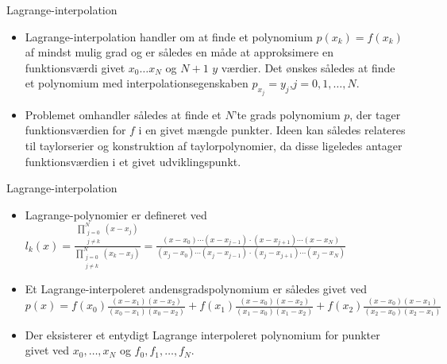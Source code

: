
\begin{frame}{Lagrange-interpolation}
    \begin{itemize}
        \item Lagrange-interpolation handler om at finde et polynomium $p(x_k)=f(x_k)$ af mindst mulig grad og er således en måde at approksimere en funktionsværdi givet $x_0 \ldots x_N$ og $N+1 $  $y$ værdier.
        Det ønskes således at finde et polynomium med interpolationsegenskaben $p_{x_j}=y_j$,$j=0,1,\ldots,N$.

        \item Problemet omhandler således at finde et $N$'te grads polynomium $p$, der tager funktionsværdien for $f$ i en givet mængde punkter. 
        Ideen kan således relateres til taylorserier og konstruktion af taylorpolynomier, da disse ligeledes antager funktionsværdien i et givet udviklingspunkt.
    \end{itemize}
\end{frame}
\begin{frame}{Lagrange-interpolation}
    \begin{itemize}
        \item Lagrange-polynomier er defineret ved \\
            $
            l_k(x)=\frac{\prod_{\substack{j=0 \\ {j \neq k}}}^{N}(x-x_j)}{\prod_{\substack{j=0 \\ {j \neq k}}}^{N}(x_k-x_j)}=\frac{(x-x_0) \cdots (x-x_{j-1}) \cdot (x-x_{j+1})\cdots(x-x_N)}{(x_j-x_0)\cdots (x_j-x_{j-1}) \cdot (x_j-x_{j+1})\cdots (x_j - x_N)}
            $
        \item Et Lagrange-interpoleret andensgradspolynomium er således givet ved $ p(x)=f(x_0)\frac{(x-x_1)(x-x_2)}{(x_0-x_1)(x_0-x_2)}+f(x_1)\frac{(x-x_0)(x-x_2)}{(x_1-x_0)(x_1-x_2)}+f(x_2)\frac{(x-x_0)(x-x_1)}{(x_2-x_0)(x_2-x_1)} $
        \item Der eksisterer et entydigt Lagrange interpoleret polynomium for punkter givet ved $x_0, \ldots, x_N$ og $f_0, f_1, \ldots , f_N$.
        
    \end{itemize}
\end{frame}


